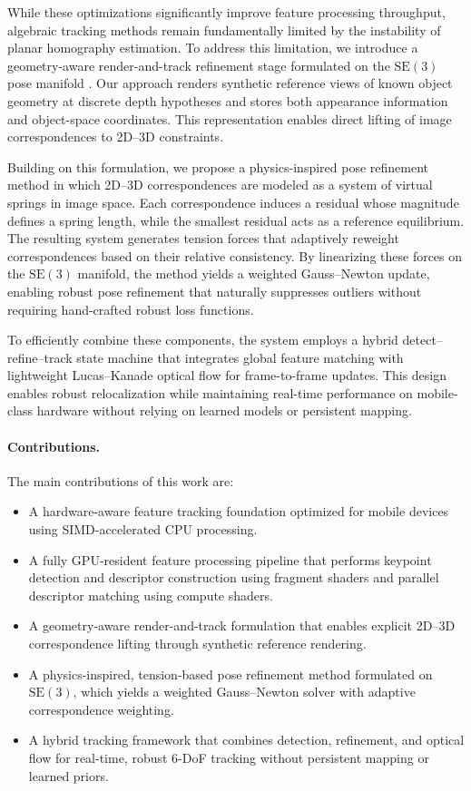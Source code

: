 While these optimizations significantly improve feature processing throughput, algebraic tracking methods remain fundamentally limited by the instability of planar homography estimation. To address this limitation, we introduce a geometry-aware render-and-track refinement stage formulated on the $\mathrm{SE}(3)$ pose manifold \cite{sola2018micro, barfoot2017state}. Our approach renders synthetic reference views of known object geometry at discrete depth hypotheses and stores both appearance information and object-space coordinates. This representation enables direct lifting of image correspondences to 2D--3D constraints.

Building on this formulation, we propose a physics-inspired pose refinement method in which 2D--3D correspondences are modeled as a system of virtual springs in image space. Each correspondence induces a residual whose magnitude defines a spring length, while the smallest residual acts as a reference equilibrium. The resulting system generates tension forces that adaptively reweight correspondences based on their relative consistency. By linearizing these forces on the $\mathrm{SE}(3)$ manifold, the method yields a weighted Gauss--Newton update, enabling robust pose refinement that naturally suppresses outliers without requiring hand-crafted robust loss functions.

To efficiently combine these components, the system employs a hybrid detect--refine--track state machine that integrates global feature matching with lightweight Lucas--Kanade optical flow for frame-to-frame updates. 
This design enables robust relocalization while maintaining real-time performance on mobile-class hardware without relying on learned models or persistent mapping.

\paragraph{Contributions.}
The main contributions of this work are:
\begin{itemize}
    \item A hardware-aware feature tracking foundation optimized for mobile devices using SIMD-accelerated CPU processing.
    \item A fully GPU-resident feature processing pipeline that performs keypoint detection and descriptor construction using fragment shaders and parallel descriptor matching using compute shaders.
    \item A geometry-aware render-and-track formulation that enables explicit 2D--3D correspondence lifting through synthetic reference rendering.
    \item A physics-inspired, tension-based pose refinement method formulated on $\mathrm{SE}(3)$, which yields a weighted Gauss--Newton solver with adaptive correspondence weighting.
    \item A hybrid tracking framework that combines detection, refinement, and optical flow for real-time, robust 6-DoF tracking without persistent mapping or learned priors.
\end{itemize}